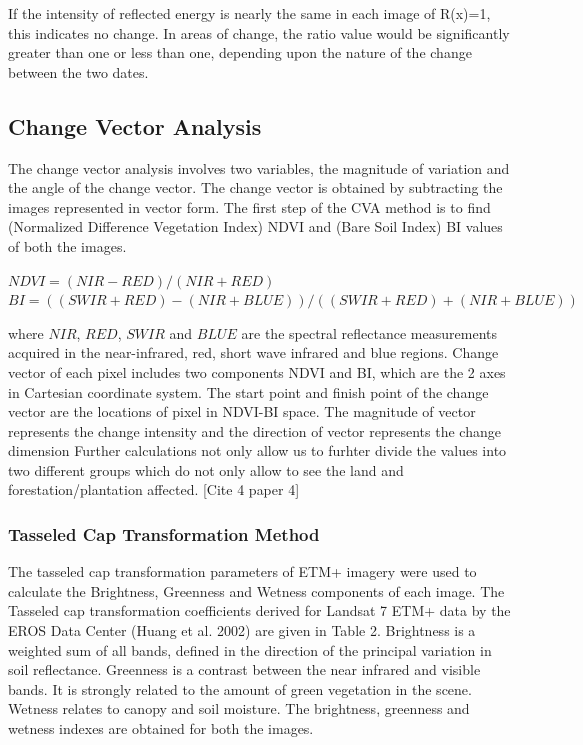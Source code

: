 \documentclass[12pt,a4paper]{article}
\begin{document}
If the intensity of reflected energy is nearly the same in each image of R(x)=1, this indicates no change. In areas of change, the ratio value would be significantly greater than one or less than one, depending upon the nature of the change between the two dates. 


\subsection[3.4]{Change Vector Analysis}
The change vector analysis involves two variables, the magnitude of variation and the angle of the change vector.
The change vector is obtained by subtracting the images represented in vector form.
The first step of the CVA method is to find (Normalized Difference Vegetation Index) NDVI and (Bare Soil Index) BI values of both the images.

$NDVI = (NIR - RED) / (NIR + RED)$
\newline $BI = ((SWIR + RED) - (NIR + BLUE)) / ((SWIR + RED) + (NIR + BLUE))$

where $NIR$, $RED$, $SWIR$ and $BLUE$ are the spectral reflectance measurements acquired in the near-infrared, red, short wave infrared and blue regions.
Change vector of each pixel includes two components NDVI and BI, which are the 2 axes in Cartesian coordinate system. The start point and finish point of the change vector are the locations of pixel in NDVI-BI space. The magnitude of vector represents the change intensity and the direction of vector represents the change dimension 
Further calculations not only allow us to furhter divide the values into two different groups which do not only allow to see the land and forestation/plantation affected. [Cite 4 paper 4]

\subsubsection[3.4.1]{Tasseled Cap Transformation Method}
The tasseled cap transformation parameters of ETM+ imagery were used to calculate the Brightness, Greenness 
and Wetness components of each image. The Tasseled cap transformation coefficients derived for Landsat 7 ETM+ 
data by the EROS Data Center (Huang et al. 2002) are given in Table 2. Brightness is a weighted sum of all bands, 
defined in the direction of the principal variation in soil reflectance. Greenness is a contrast between the near infrared and visible bands. It is strongly related to the amount of green vegetation in the scene. Wetness relates to 
canopy and soil moisture. The brightness, greenness and wetness indexes are obtained for both the images.
\end{document}
